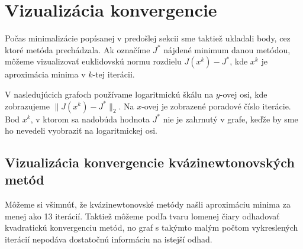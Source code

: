 \documentclass[report.tex]{subfiles}
\begin{document}
\section{Vizualizácia konvergencie}\label{sec:EF}

Počas minimalizácie popísanej v predošlej sekcii sme taktiež ukladali body, cez ktoré metóda prechádzala. Ak označíme $J^*$ nájdené minimum danou metódou, môžeme vizualizovať euklidovskú normu rozdielu $J(x^k) - J^*$, kde $x^k$ je aproximácia minima v $k$-tej iterácii.

V nasledujúcich grafoch používame logaritmickú škálu na $y$-ovej osi, kde zobrazujeme $\lVert J(x^k) - J^*\rVert_2$. Na $x$-ovej je zobrazené poradové číslo iterácie. Bod $x^k$, v ktorom sa nadobúda hodnota $J^*$ nie je zahrnutý v grafe, keďže by sme ho nevedeli vyobraziť na logaritmickej osi.

\subsection{Vizualizácia konvergencie kvázinewtonovských metód}

Môžeme si všimnúť, že kvázinewtonovské metódy našli aproximáciu minima za menej ako 13 iterácií. Taktiež môžeme podľa tvaru lomenej čiary odhadovať kvadratickú konvergenciu metód, no graf s takýmto malým počtom vykreslených iterácií nepodáva dostatočnú informáciu na istejší odhad.
\end{document}

